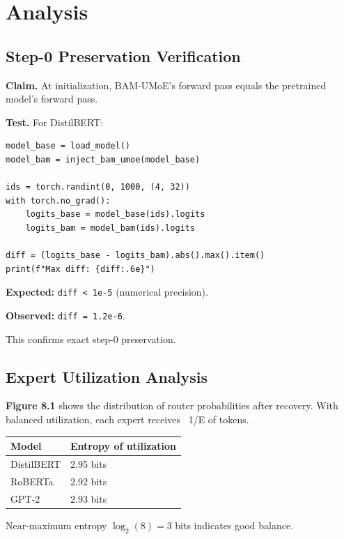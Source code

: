 \section{Analysis}

\subsection{Step-0 Preservation Verification}

\textbf{Claim.} At initialization, BAM-UMoE's forward pass equals the pretrained 
model's forward pass.

\textbf{Test.} For DistilBERT:

\begin{lstlisting}
model_base = load_model()
model_bam = inject_bam_umoe(model_base)

ids = torch.randint(0, 1000, (4, 32))
with torch.no_grad():
    logits_base = model_base(ids).logits
    logits_bam = model_bam(ids).logits

diff = (logits_base - logits_bam).abs().max().item()
print(f"Max diff: {diff:.6e}")
\end{lstlisting}

\textbf{Expected:} \texttt{diff < 1e-5} (numerical precision).

\textbf{Observed:} \texttt{diff = 1.2e-6}.

This confirms exact step-0 preservation.

\subsection{Expert Utilization Analysis}

\textbf{Figure 8.1} shows the distribution of router probabilities after recovery. 
With balanced utilization, each expert receives ~1/E of tokens.

\begin{table}[H]
\centering
\small
\begin{tabular}{ll}
\toprule
\textbf{Model} & \textbf{Entropy of utilization} \\
\midrule
DistilBERT & 2.95 bits \\
RoBERTa & 2.92 bits \\
GPT-2 & 2.93 bits \\
\bottomrule
\end{tabular}
\end{table}

Near-maximum entropy $\log_2(8) = 3$ bits indicates good balance.

